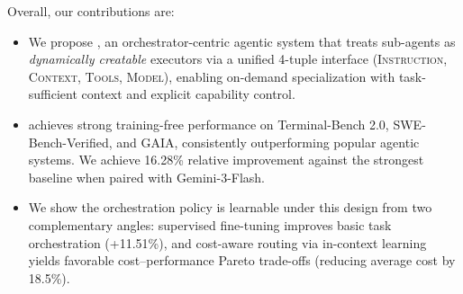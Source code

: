 Overall, our contributions are:
\begin{itemize}
    \item We propose \our, an orchestrator-centric agentic system that treats sub-agents as \emph{dynamically creatable} executors via a unified 4-tuple interface \textsc{(Instruction, Context, Tools, Model)}, enabling on-demand specialization with task-sufficient context and explicit capability control.
    \item \our achieves strong training-free performance on Terminal-Bench 2.0, SWE-Bench-Verified, and GAIA, consistently outperforming popular agentic systems. We achieve 16.28\% relative improvement against the strongest baseline when paired with Gemini-3-Flash.  
    \item We show the orchestration policy is learnable under this design from two complementary angles: supervised fine-tuning improves basic task orchestration (+11.51\%), and cost-aware routing via in-context learning yields favorable cost--performance Pareto trade-offs (reducing average cost by 18.5\%).
\end{itemize}

